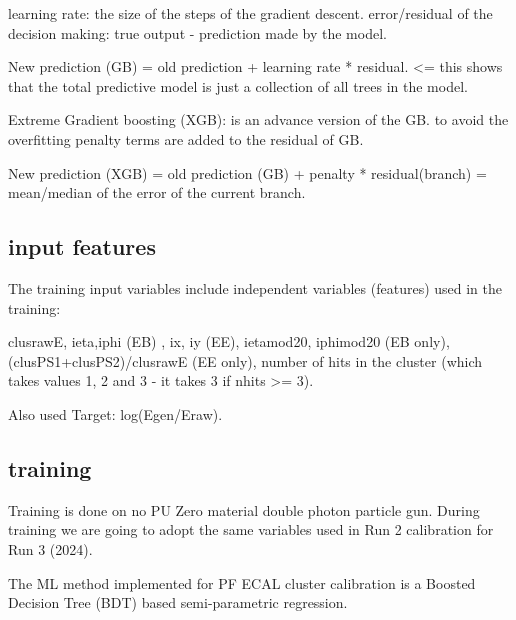 learning rate: the size of the steps of the gradient descent.
error/residual of the decision making: true output - prediction made by the model.

New prediction (GB)  = old prediction + learning rate * residual. <= this shows that the total predictive model is just a collection of all trees in the model.

Extreme Gradient boosting (XGB): is an advance version of the GB. to avoid the overfitting penalty terms are added to the residual of GB.

New prediction (XGB) = old prediction (GB) + penalty * residual(branch) = mean/median of the error of the current branch.



\subsection{input features}
The training input variables include independent variables (features) used in the training:

clusrawE,
ieta,iphi (EB) ,
ix, iy (EE),
ietamod20, iphimod20 (EB only),
(clusPS1+clusPS2)/clusrawE (EE only),
number of hits in the cluster (which takes values 1, 2 and 3 - it takes 3 if nhits >= 3).

Also  used Target: log(Egen/Eraw).

\subsection{training}
Training is done on no PU Zero material double photon particle gun. During training we are going to adopt the same variables used in Run 2 calibration for Run 3 (2024).

The ML method implemented for PF ECAL cluster calibration is a Boosted Decision Tree (BDT) based semi-parametric regression.

